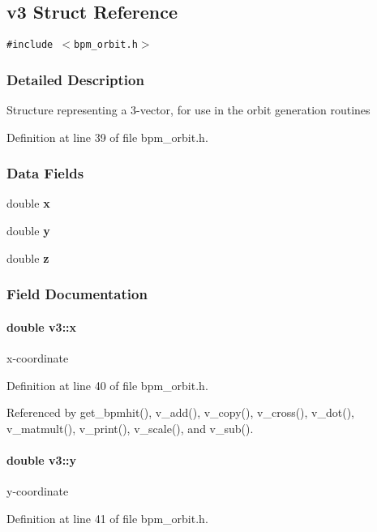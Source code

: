 \subsection{v3 Struct Reference}
\label{structv3}
{\tt \#include $<$bpm\_\-orbit.h$>$}



\subsubsection{Detailed Description}
Structure representing a 3-vector, for use in the orbit generation routines 

Definition at line 39 of file bpm\_\-orbit.h.\subsubsection*{Data Fields}
\begin{CompactItemize}
\item 
double {\bf x}
\item 
double {\bf y}
\item 
double {\bf z}
\end{CompactItemize}


\subsubsection{Field Documentation}
\paragraph[x]{\setlength{\rightskip}{0pt plus 5cm}double {\bf v3::x}}\hfill\label{structv3_f2da064a840d85848e931af31332659f}


x-coordinate 

Definition at line 40 of file bpm\_\-orbit.h.

Referenced by get\_\-bpmhit(), v\_\-add(), v\_\-copy(), v\_\-cross(), v\_\-dot(), v\_\-matmult(), v\_\-print(), v\_\-scale(), and v\_\-sub().
\paragraph[y]{\setlength{\rightskip}{0pt plus 5cm}double {\bf v3::y}}\hfill\label{structv3_7d96d6103573c71c7b22ecc042eb6a5b}


y-coordinate 

Definition at line 41 of file bpm\_\-orbit.h.


